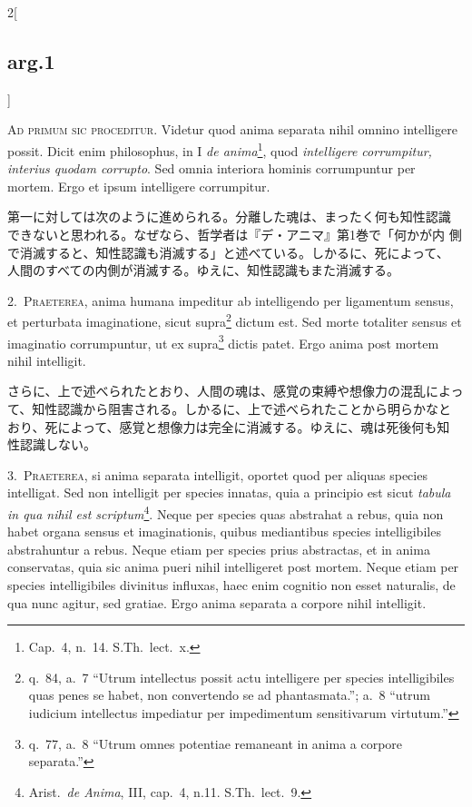 \documentclass[paper=a4paper,fontsize=10pt,jafontsize=9pt,titlepage]{jlreq}
\begin{document}
\begin{paracol}{2}[\subsection{arg.1}]

{\huge A}{\scshape d primum sic proceditur}. Videtur quod anima separata nihil omnino
 intelligere possit. Dicit enim philosophus, in I {\itshape de
 anima}\footnote{Cap.~4, n.~14. S.Th.~lect.~x.}, quod
 {\itshape intelligere corrumpitur, interius quodam corrupto}. Sed omnia interiora
 hominis corrumpuntur per mortem. Ergo et ipsum intelligere corrumpitur.

\switchcolumn

第一に対しては次のように進められる。分離した魂は、まったく何も知性認識
できないと思われる。なぜなら、哲学者は『デ・アニマ』第1巻で「何かが内
側で消滅すると、知性認識も消滅する」と述べている。しかるに、死によって、
人間のすべての内側が消滅する。ゆえに、知性認識もまた消滅する。


2.~{\scshape Praeterea}, anima humana impeditur ab intelligendo per
ligamentum
sensus, et perturbata imaginatione, sicut supra\footnote{q.~84, a.~7
``Utrum intellectus possit actu intelligere per species intelligibiles
quas penes se habet, non convertendo se ad phantasmata.''; a.~8
``utrum iudicium intellectus impediatur per impedimentum sensitivarum
virtutum.''} dictum est. Sed morte totaliter sensus et imaginatio
corrumpuntur, ut ex supra\footnote{q.~77, a.~8 ``Utrum omnes potentiae
remaneant in anima a corpore separata.''} dictis patet. Ergo anima
post mortem nihil intelligit.

\switchcolumn

さらに、上で述べられたとおり、人間の魂は、感覚の束縛や想像力の混乱によっ
て、知性認識から阻害される。しかるに、上で述べられたことから明らかなと
おり、死によって、感覚と想像力は完全に消滅する。ゆえに、魂は死後何も知
性認識しない。


3.~{\scshape Praeterea}, si anima separata intelligit, oportet quod per
aliquas species intelligat. Sed non intelligit per species innatas,
quia a principio est sicut {\itshape tabula in qua nihil est
scriptum}\footnote{Arist.~{\itshape de Anima}, III, cap.~4,
n.11. S.Th.~lect.~9.  }. Neque per species quas abstrahat a rebus,
quia non habet organa sensus et imaginationis, quibus mediantibus
species intelligibiles abstrahuntur a rebus. Neque etiam per species
prius abstractas, et in anima conservatas, quia sic anima pueri nihil
intelligeret post mortem. Neque etiam per species intelligibiles
divinitus influxas, haec enim cognitio non esset naturalis, de qua
nunc agitur, sed gratiae. Ergo anima separata a corpore nihil
intelligit.


\end{paracol}
\end{document}
